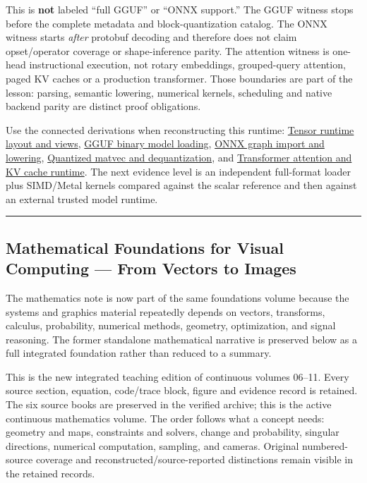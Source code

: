This is \textbf{not} labeled ``full GGUF'' or ``ONNX support.'' The GGUF witness stops before the complete metadata and block-quantization catalog. The ONNX witness starts \emph{after} protobuf decoding and therefore does not claim opset/operator coverage or shape-inference parity. The attention witness is one-head instructional execution, not rotary embeddings, grouped-query attention, paged KV caches or a production transformer. Those boundaries are part of the lesson: parsing, semantic lowering, numerical kernels, scheduling and native backend parity are distinct proof obligations.

Use the connected derivations when reconstructing this runtime: \hyperref[appendix-cebadf3106d1]{Tensor runtime layout and views}, \hyperref[appendix-fef72dd246f2]{GGUF binary model loading}, \hyperref[appendix-a87217e3af2b]{ONNX graph import and lowering}, \hyperref[appendix-241c0e42ac2d]{Quantized matvec and dequantization}, and \hyperref[appendix-ea2dadd21ce5]{Transformer attention and KV cache runtime}. The next evidence level is an independent full-format loader plus SIMD/Metal kernels compared against the scalar reference and then against an external trusted model runtime.

\begin{center}\rule{0.5\linewidth}{0.5pt}\end{center}

\subsection{Mathematical Foundations for Visual Computing --- From Vectors to Images}\label{mathematical-foundations-for-visual-computing-from-vectors-to-images}

The mathematics note is now part of the same foundations volume because the systems and graphics material repeatedly depends on vectors, transforms, calculus, probability, numerical methods, geometry, optimization, and signal reasoning. The former standalone mathematical narrative is preserved below as a full integrated foundation rather than reduced to a summary.

This is the new integrated teaching edition of continuous volumes 06--11. Every source section, equation, code/trace block, figure and evidence record is retained. The six source books are preserved in the verified archive; this is the active continuous mathematics volume. The order follows what a concept needs: geometry and maps, constraints and solvers, change and probability, singular directions, numerical computation, sampling, and cameras. Original numbered-source coverage and reconstructed/source-reported distinctions remain visible in the retained records.

